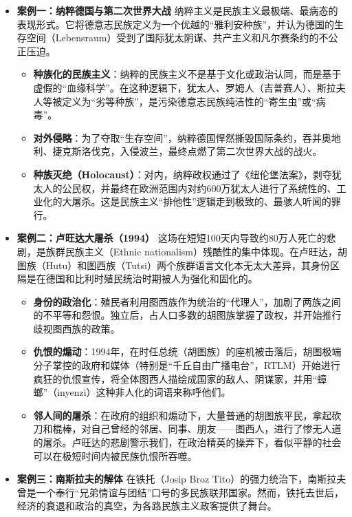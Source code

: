 \begin{itemize}[noitemsep,topsep=0pt]
    \item \textbf{案例一：纳粹德国与第二次世界大战}
    纳粹主义是民族主义最极端、最病态的表现形式。它将德意志民族定义为一个优越的“雅利安种族”，并认为德国的生存空间（Lebensraum）受到了国际犹太阴谋、共产主义和凡尔赛条约的不公正压迫。
    \begin{itemize}[noitemsep,topsep=0pt]
        \item \textbf{种族化的民族主义}：纳粹的民族主义不是基于文化或政治认同，而是基于虚假的“血缘科学”。在这种逻辑下，犹太人、罗姆人（吉普赛人）、斯拉夫人等被定义为“劣等种族”，是污染德意志民族纯洁性的“寄生虫”或“病毒”。
        \item \textbf{对外侵略}：为了夺取“生存空间”，纳粹德国悍然撕毁国际条约，吞并奥地利、捷克斯洛伐克，入侵波兰，最终点燃了第二次世界大战的战火。
        \item \textbf{种族灭绝（Holocaust）}：对内，纳粹政权通过了《纽伦堡法案》，剥夺犹太人的公民权，并最终在欧洲范围内对约600万犹太人进行了系统性的、工业化的大屠杀。这是民族主义“排他性”逻辑走到极致的、最骇人听闻的罪行。
    \end{itemize}
    \item \textbf{案例二：卢旺达大屠杀（1994）}
    这场在短短100天内导致约80万人死亡的悲剧，是族群民族主义（Ethnic nationalism）残酷性的集中体现。在卢旺达，胡图族（Hutu）和图西族（Tutsi）两个族群语言文化本无太大差异，其身份区隔是在德国和比利时殖民统治时期被人为强化和固化的。
    \begin{itemize}[noitemsep,topsep=0pt]
        \item \textbf{身份的政治化}：殖民者利用图西族作为统治的“代理人”，加剧了两族之间的不平等和怨恨。独立后，占人口多数的胡图族掌握了政权，并开始推行歧视图西族的政策。
        \item \textbf{仇恨的煽动}：1994年，在时任总统（胡图族）的座机被击落后，胡图极端分子掌控的政府和媒体（特别是“千丘自由广播电台”，RTLM）开始进行疯狂的仇恨宣传，将全体图西人描绘成国家的敌人、阴谋家，并用“蟑螂”（inyenzi）这种非人化的词语来称呼他们。
        \item \textbf{邻人间的屠杀}：在政府的组织和煽动下，大量普通的胡图族平民，拿起砍刀和棍棒，对自己曾经的邻居、同事、朋友——图西人，进行了惨无人道的屠杀。卢旺达的悲剧警示我们，在政治精英的操弄下，看似平静的社会可以在极短时间内被民族仇恨所吞噬。
    \end{itemize}
    \item \textbf{案例三：南斯拉夫的解体}
    在铁托（Josip Broz Tito）的强力统治下，南斯拉夫曾是一个奉行“兄弟情谊与团结”口号的多民族联邦国家。然而，铁托去世后，经济的衰退和政治的真空，为各路民族主义政客提供了舞台。

\end{itemize}
